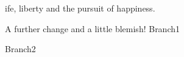 \documentclass{article}
\begin{document}
ife, liberty and the pursuit of happiness.

A further change and a little blemish! Branch1

Branch2
\end{document}

